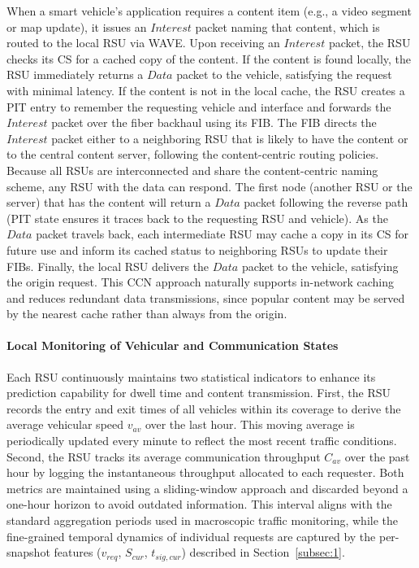 \documentclass[journal]{IEEEtran}
\begin{document}
When a smart vehicle's application requires a content item (e.g., a video segment or map update), it issues an \(Interest\) packet naming that content, which is routed to the local RSU via WAVE.
Upon receiving an \(Interest\) packet, the RSU checks its CS for a cached copy of the content.
If the content is found locally, the RSU immediately returns a \(Data\) packet to the vehicle, satisfying the request with minimal latency.
If the content is not in the local cache, the RSU creates a PIT entry to remember the requesting vehicle and interface and forwards the \(Interest\) packet over the fiber backhaul using its FIB.
The FIB directs the \(Interest\) packet either to a neighboring RSU that is likely to have the content or to the central content server, following the content-centric routing policies.
Because all RSUs are interconnected and share the content-centric naming scheme, any RSU with the data can respond.
The first node (another RSU or the server) that has the content will return a \(Data\) packet following the reverse path (PIT state ensures it traces back to the requesting RSU and vehicle).
As the \(Data\) packet travels back, each intermediate RSU may cache a copy in its CS for future use and inform its cached status to neighboring RSUs to update their FIBs.
Finally, the local RSU delivers the \(Data\) packet to the vehicle, satisfying the origin request.
This CCN approach naturally supports in-network caching and reduces redundant data transmissions, since popular content may be served by the nearest cache rather than always from the origin.

\paragraph{Local Monitoring of Vehicular and Communication States}
Each RSU continuously maintains two statistical indicators to enhance its prediction capability for dwell time and content transmission.
First, the RSU records the entry and exit times of all vehicles within its coverage to derive the average vehicular speed $v_{av}$ over the last hour.
This moving average is periodically updated every minute to reflect the most recent traffic conditions.
Second, the RSU tracks its average communication throughput $C_{av}$ over the past hour by logging the instantaneous throughput allocated to each requester.
Both metrics are maintained using a sliding-window approach and discarded beyond a one-hour horizon to avoid outdated information.
This interval aligns with the standard aggregation periods used in macroscopic traffic monitoring, while the fine-grained temporal dynamics of individual requests are captured by the per-snapshot features ($v_{req}$, $S_{cur}$, $t_{sig,cur}$) described in Section~\ref{subsec:1}.
\end{document}

